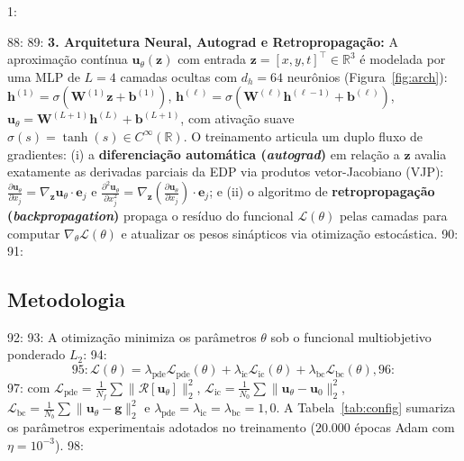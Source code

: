 1: \documentclass[a4paper, 12pt, twoside]{article}
\begin{document}
88: 
89: \textbf{3. Arquitetura Neural, Autograd e Retropropagação:} A aproximação contínua $\mathbf{u}_\theta(\mathbf{z})$ com entrada $\mathbf{z} = [x, y, t]^\top \in \mathbb{R}^3$ é modelada por uma MLP de $L=4$ camadas ocultas com $d_h=64$ neurônios (Figura~\ref{fig:arch}): $\mathbf{h}^{(1)} = \sigma(\mathbf{W}^{(1)}\mathbf{z} + \mathbf{b}^{(1)})$, $\mathbf{h}^{(\ell)} = \sigma(\mathbf{W}^{(\ell)}\mathbf{h}^{(\ell-1)} + \mathbf{b}^{(\ell)})$, $\mathbf{u}_\theta = \mathbf{W}^{(L+1)}\mathbf{h}^{(L)} + \mathbf{b}^{(L+1)}$, com ativação suave $\sigma(s) = \tanh(s) \in C^\infty(\mathbb{R})$. O treinamento articula um duplo fluxo de gradientes: (i) a \textbf{diferenciação automática (\textit{autograd})} em relação a $\mathbf{z}$ avalia exatamente as derivadas parciais da EDP via produtos vetor-Jacobiano (VJP): $\frac{\partial \mathbf{u}_\theta}{\partial x_j} = \nabla_{\mathbf{z}}\mathbf{u}_\theta \cdot \mathbf{e}_j$ e $\frac{\partial^2 \mathbf{u}_\theta}{\partial x_j^2} = \nabla_{\mathbf{z}}(\frac{\partial \mathbf{u}_\theta}{\partial x_j}) \cdot \mathbf{e}_j$; e (ii) o algoritmo de \textbf{retropropagação (\textit{backpropagation})} propaga o resíduo do funcional $\mathcal{L}(\theta)$ pelas camadas para computar $\nabla_\theta \mathcal{L}(\theta)$ e atualizar os pesos sinápticos via otimização estocástica.
90: 
91: \subsection{Metodologia}
92: 
93: A otimização minimiza os parâmetros $\theta$ sob o funcional multiobjetivo ponderado $L_2$:
94: \begin{equation}
95:     \mathcal{L}(\theta) = \lambda_{\mathrm{pde}}\mathcal{L}_{\mathrm{pde}}(\theta) + \lambda_{\mathrm{ic}}\mathcal{L}_{\mathrm{ic}}(\theta) + \lambda_{\mathrm{bc}}\mathcal{L}_{\mathrm{bc}}(\theta), \label{eq:loss}
96: \end{equation}
97: com $\mathcal{L}_{\mathrm{pde}} = \frac{1}{N_f}\sum \|\mathcal{R}[\mathbf{u}_\theta]\|_2^2$, $\mathcal{L}_{\mathrm{ic}} = \frac{1}{N_0}\sum \|\mathbf{u}_\theta - \mathbf{u}_0\|_2^2$, $\mathcal{L}_{\mathrm{bc}} = \frac{1}{N_b}\sum \|\mathbf{u}_\theta - \mathbf{g}\|_2^2$ e $\lambda_{\mathrm{pde}} = \lambda_{\mathrm{ic}} = \lambda_{\mathrm{bc}} = 1{,}0$. A Tabela~\ref{tab:config} sumariza os parâmetros experimentais adotados no treinamento ($20.000$ épocas Adam com $\eta = 10^{-3}$).
98: 
\end{document}
